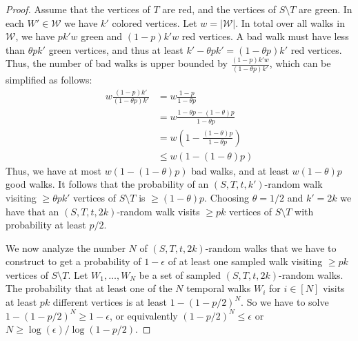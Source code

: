 \documentclass[10pt,a4paper]{article}
\begin{document}
{{\begin{proof}
    Assume that {the %
    vertices} of $T$ are red, and the vertices of $S\setminus T$ are
    green. In each $W' \in \mathcal{W}$ we have $k'$ colored vertices. 
    Let $w=|\mathcal{W}|$. In total over all {walks} in $\mathcal{W}$, we have $pk'w$ green and $(1-p)k'w$
    red vertices. A bad walk must have less than $\theta pk'$ green vertices,
    and thus at least $k'-\theta pk'=(1-\theta p)k'$ 
    red vertices. Thus, the
    number of bad walks is upper bounded by {$\frac{(1-p)k' w}{(1-\theta p)k'}$},
    which can be simplified as follows:
    \begin{align*}
        w\frac{(1-p)k'}{(1-\theta p)k'}  &= w\frac{1-p}{1-\theta p} \\
                                        &= w\frac{1-\theta p - (1-\theta)p}{1-\theta p} \\
                                        &= w(1-\frac{(1-\theta)p}{1-\theta p}) \\
                                        &\leq w(1-(1-\theta)p)
    \end{align*}
    Thus, we have at most $w(1-(1-\theta)p)$ bad walks, and at least
    $w(1-\theta)p$ good walks. It follows that the probability of an $(S, T,
    t, k')$-random walk visiting $\geq \theta pk'$ vertices of $S\setminus T$
    is $\geq (1-\theta) p$. Choosing $\theta = 1/2$ and $k'=2k$ we have that an
    $(S, T, t, 2k)$-random walk visits $\geq pk$ vertices of $S \setminus T$
    with probability at least $p/2$.

    We now analyze the number $N$ of $(S, T, t, 2k)$-random walks that we have to construct to get a
    probability of $1-\epsilon$ of {at least one sampled walk visiting $\geq pk$} vertices of $S\setminus
    T$. Let $W_1, \ldots, W_N$ be a set of sampled {$(S, T, t, 2k)$}-random walks.
    The probability that at least one of the $N$ temporal walks $W_i$ for $i \in
    [N]$ visits at least $pk$ different vertices is at least $1 - (1-p/2)^N$.
    So we have to solve $1 - (1-p/2)^N \geq 1 - \epsilon$, {
    or equivalently
    $(1-p/2)^N \leq \epsilon$ or $N\geq \log(\epsilon)/\log(1-p/2)$.}
%


\end{proof}}}
\end{document}

